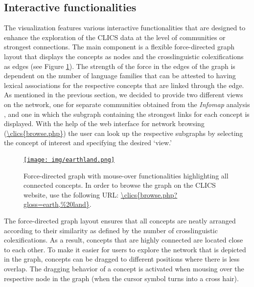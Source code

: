 \subsection{Interactive functionalities}



The visualization features various interactive functionalities that are designed to enhance the exploration of the CLICS data at the level of communities or strongest connections. The main component is a flexible force-directed graph layout that displays the concepts as nodes and the crosslinguistic colexifications as edges (see Figure \ref{EarthLand}). The strength of the force in the edges of the graph is dependent on the number of language families that can be attested to having lexical associations for the respective concepts that are linked through the edge. As mentioned in the previous section, we decided to provide two different views on the network, one for separate communities obtained from the \emph{Infomap} analysis \cite{Rosvall2008}, and one in which the subgraph containing the strongest links for each concept is displayed.  With the help of the web interface for network browsing (\url{\clics{browse.php}}) the user can look up the respective subgraphs by selecting the concept of interest and specifying the desired `view.'

\begin{figure}[htbp]
    \centering
    \href{\clics{browse.php?gloss=earth,\%20land}}{\texttt{[image: img/earthland.png]}}
\caption{Force-directed graph with mouse-over functionalities highlighting all connected concepts.
In order to browse the graph on the CLICS website, use the following URL: \url{\clics{browse.php?gloss=earth,\%20land}}.}
\label{EarthLand}
\end{figure}

The force-directed graph layout ensures that all concepts are neatly arranged according to their similarity as defined by the number of crosslinguistic colexifications. As a result, concepts that are highly connected are located close to each other.  To make it easier for users to explore the network that is depicted in the graph, concepts can be dragged to different positions where there is less overlap. The dragging behavior of a concept  is activated when mousing over the respective node in the graph (when the cursor symbol turns into a cross hair). 

